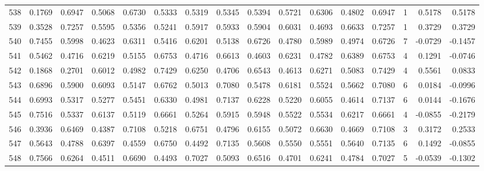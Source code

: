 \begin{tabular}{lrrrrrrrrrrrrrrr}
538 &      0.1769 &  0.6947 &  0.5068 &  0.6730 &  0.5333 &  0.5319 &  0.5345 &  0.5394 &  0.5721 &  0.6306 &   0.4802 &     0.6947 &      1 &                    0.5178 &                     0.5178 \\
539 &      0.3528 &  0.7257 &  0.5595 &  0.5356 &  0.5241 &  0.5917 &  0.5933 &  0.5904 &  0.6031 &  0.4693 &   0.6633 &     0.7257 &      1 &                    0.3729 &                     0.3729 \\
540 &      0.7455 &  0.5998 &  0.4623 &  0.6311 &  0.5416 &  0.6201 &  0.5138 &  0.6726 &  0.4780 &  0.5989 &   0.4974 &     0.6726 &      7 &                   -0.0729 &                    -0.1457 \\
541 &      0.5462 &  0.4716 &  0.6219 &  0.5155 &  0.6753 &  0.4716 &  0.6613 &  0.4603 &  0.6231 &  0.4782 &   0.6389 &     0.6753 &      4 &                    0.1291 &                    -0.0746 \\
542 &      0.1868 &  0.2701 &  0.6012 &  0.4982 &  0.7429 &  0.6250 &  0.4706 &  0.6543 &  0.4613 &  0.6271 &   0.5083 &     0.7429 &      4 &                    0.5561 &                     0.0833 \\
543 &      0.6896 &  0.5900 &  0.6093 &  0.5147 &  0.6762 &  0.5013 &  0.7080 &  0.5478 &  0.6181 &  0.5524 &   0.5662 &     0.7080 &      6 &                    0.0184 &                    -0.0996 \\
544 &      0.6993 &  0.5317 &  0.5277 &  0.5451 &  0.6330 &  0.4981 &  0.7137 &  0.6228 &  0.5220 &  0.6055 &   0.4614 &     0.7137 &      6 &                    0.0144 &                    -0.1676 \\
545 &      0.7516 &  0.5337 &  0.6137 &  0.5119 &  0.6661 &  0.5264 &  0.5915 &  0.5948 &  0.5522 &  0.5534 &   0.6217 &     0.6661 &      4 &                   -0.0855 &                    -0.2179 \\
546 &      0.3936 &  0.6469 &  0.4387 &  0.7108 &  0.5218 &  0.6751 &  0.4796 &  0.6155 &  0.5072 &  0.6630 &   0.4669 &     0.7108 &      3 &                    0.3172 &                     0.2533 \\
547 &      0.5643 &  0.4788 &  0.6397 &  0.4559 &  0.6750 &  0.4492 &  0.7135 &  0.5608 &  0.5550 &  0.5551 &   0.5640 &     0.7135 &      6 &                    0.1492 &                    -0.0855 \\
548 &      0.7566 &  0.6264 &  0.4511 &  0.6690 &  0.4493 &  0.7027 &  0.5093 &  0.6516 &  0.4701 &  0.6241 &   0.4784 &     0.7027 &      5 &                   -0.0539 &                    -0.1302 \\

\end{tabular}
